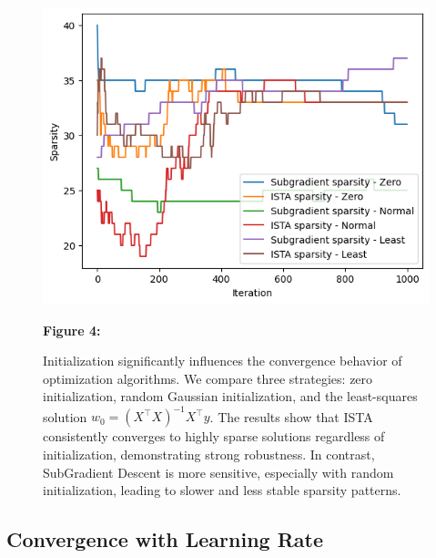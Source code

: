 \documentclass[11pt]{article}
\begin{document}
\begin{figure}[H]
    \centering
    \begin{minipage}{0.3\textwidth}
        \includegraphics[width=\linewidth]{figures/fig6.png}
    \end{minipage}
    \hfill
    \begin{minipage}{0.5\textwidth}
        \small
        \textbf{Figure 4:}

        Initialization significantly influences the convergence behavior of optimization algorithms. We compare three strategies: zero initialization, random Gaussian initialization, and the least-squares solution \( w_0 = (X^\top X)^{-1} X^\top y \). The results show that ISTA consistently converges to highly sparse solutions regardless of initialization, demonstrating strong robustness. In contrast, SubGradient Descent is more sensitive, especially with random initialization, leading to slower and less stable sparsity patterns.


    \end{minipage}
\end{figure}



\subsection{Convergence with Learning Rate}
\end{document}
